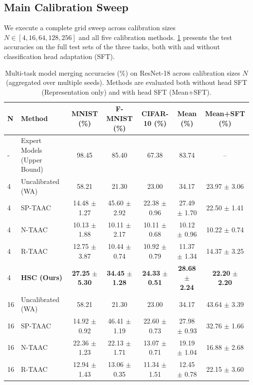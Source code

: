 \documentclass{article}
\begin{document}
\subsection{Main Calibration Sweep}
We execute a complete grid sweep across calibration sizes $N \in [4, 16, 64, 128, 256]$ and all five calibration methods. \cref{tab:main} presents the test accuracies on the full test sets of the three tasks, both with and without classification head adaptation (SFT).

\begin{table}[t]
\caption{Multi-task model merging accuracies (\%) on ResNet-18 across calibration sizes $N$ (aggregated over multiple seeds). Methods are evaluated both without head SFT (Representation only) and with head SFT (Mean+SFT).}
\label{tab:main}
\vskip 0.15in
\begin{center}
\begin{small}
\setlength{\tabcolsep}{4.5pt}
\begin{tabular}{llccccc}
\toprule
N & Method & MNIST (\%) & F-MNIST (\%) & CIFAR-10 (\%) & Mean (\%) & Mean+SFT (\%) \\
\midrule
- & Expert Models (Upper Bound) & 98.45 & 85.40 & 67.38 & 83.74 & -- \\
\midrule
4 & Uncalibrated (WA) & 58.21 & 21.30 & 23.00 & 34.17 & 23.97 $\pm$ 3.06 \\
4 & SP-TAAC & 14.48 $\pm$ 1.27 & 45.60 $\pm$ 2.92 & 22.38 $\pm$ 0.96 & 27.49 $\pm$ 1.70 & 22.50 $\pm$ 1.41 \\
4 & N-TAAC & 10.13 $\pm$ 1.88 & 10.11 $\pm$ 2.17 & 10.11 $\pm$ 0.68 & 10.12 $\pm$ 0.96 & 10.22 $\pm$ 0.74 \\
4 & R-TAAC & 12.75 $\pm$ 3.87 & 10.44 $\pm$ 0.74 & 10.92 $\pm$ 0.79 & 11.37 $\pm$ 1.34 & 14.37 $\pm$ 3.25 \\
4 & \textbf{HSC (Ours)} & \textbf{27.25} $\pm$ \textbf{5.30} & \textbf{34.45} $\pm$ \textbf{1.28} & \textbf{24.33} $\pm$ \textbf{0.51} & \textbf{28.68} $\pm$ \textbf{2.24} & \textbf{22.20} $\pm$ \textbf{2.20} \\
\midrule
16 & Uncalibrated (WA) & 58.21 & 21.30 & 23.00 & 34.17 & 43.64 $\pm$ 3.39 \\
16 & SP-TAAC & 14.92 $\pm$ 0.92 & 46.41 $\pm$ 1.19 & 22.60 $\pm$ 0.73 & 27.98 $\pm$ 0.93 & 32.76 $\pm$ 1.66 \\
16 & N-TAAC & 22.36 $\pm$ 1.23 & 22.13 $\pm$ 1.71 & 13.07 $\pm$ 0.71 & 19.19 $\pm$ 1.04 & 16.88 $\pm$ 2.68 \\
16 & R-TAAC & 12.94 $\pm$ 1.43 & 13.06 $\pm$ 0.35 & 11.34 $\pm$ 1.51 & 12.45 $\pm$ 0.78 & 22.15 $\pm$ 3.60 \\

\end{tabular}
\end{small}
\end{center}
\end{table}
\end{document}
